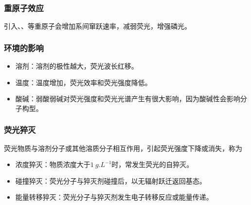\subsubsection{重原子效应}
引入、、等重原子会增加系间窜跃速率，减弱荧光，增强磷光。

\subsubsection{环境的影响}
\begin{itemize}
    \item 溶剂：溶剂的极性越大，荧光波长红移。
    \item 温度：温度增加，荧光效率和荧光强度降低。
    \item 酸碱：弱酸弱碱对荧光强度和荧光光谱产生有很大影响，因为酸碱性会影响分子构型。
\end{itemize}


\subsubsection{荧光猝灭}
荧光物质与溶剂分子或其他溶质分子相互作用，引起荧光强度下降或消失，称为
\begin{itemize}
    \item 浓度猝灭：物质浓度大于$\SI{1}{g.L^{-1}}$时，常发生荧光的自猝灭。
    \item 碰撞猝灭：荧光分子与猝灭剂碰撞后，以无辐射跃迁返回基态。
    \item 能量转移猝灭：荧光分子与猝灭剂发生电子转移反应或能量传递。
\end{itemize}
